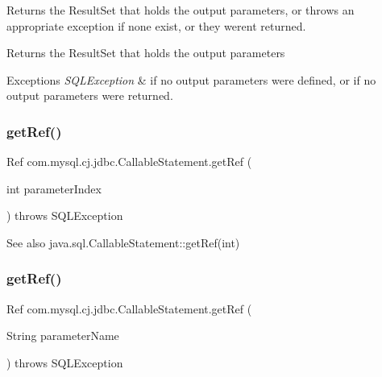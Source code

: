 Returns the Result\+Set that holds the output parameters, or throws an appropriate exception if none exist, or they weren\textquotesingle{}t returned.

\begin{DoxyReturn}{Returns}
the Result\+Set that holds the output parameters
\end{DoxyReturn}

\begin{DoxyExceptions}{Exceptions}
{\em S\+Q\+L\+Exception} & if no output parameters were defined, or if no output parameters were returned. \\
\hline
\end{DoxyExceptions}
\mbox{\label{classcom_1_1mysql_1_1cj_1_1jdbc_1_1_callable_statement_a8720b2b1d80bf651acaa37a231a54a2f}} 
\subsubsection{\texorpdfstring{get\+Ref()}{getRef()}\hspace{0.1cm}{\footnotesize\ttfamily [1/2]}}
{\footnotesize\ttfamily Ref com.\+mysql.\+cj.\+jdbc.\+Callable\+Statement.\+get\+Ref (\begin{DoxyParamCaption}\item[{int}]{parameter\+Index }\end{DoxyParamCaption}) throws S\+Q\+L\+Exception}

\begin{DoxySeeAlso}{See also}
java.\+sql.\+Callable\+Statement\+::get\+Ref(int) 
\end{DoxySeeAlso}
\mbox{\label{classcom_1_1mysql_1_1cj_1_1jdbc_1_1_callable_statement_af7a8d26f34cc8e3de6ef0f752a120522}} 
\subsubsection{\texorpdfstring{get\+Ref()}{getRef()}\hspace{0.1cm}{\footnotesize\ttfamily [2/2]}}
{\footnotesize\ttfamily Ref com.\+mysql.\+cj.\+jdbc.\+Callable\+Statement.\+get\+Ref (\begin{DoxyParamCaption}\item[{String}]{parameter\+Name }\end{DoxyParamCaption}) throws S\+Q\+L\+Exception}


